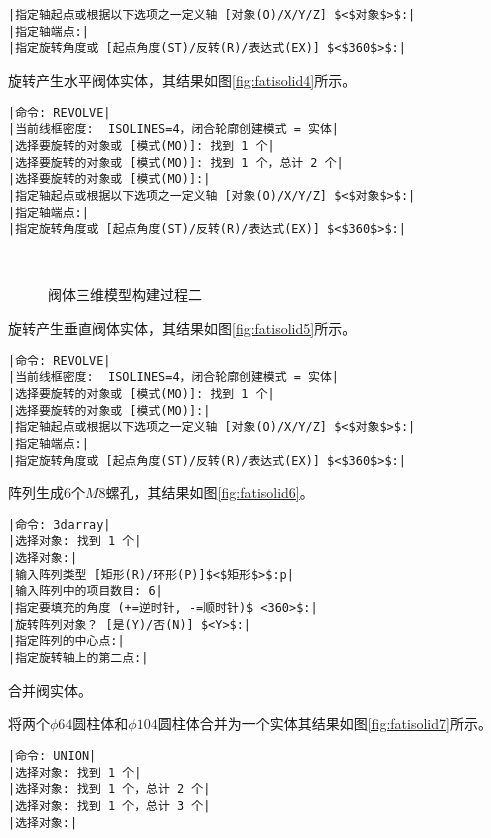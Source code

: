 \begin{procedure}
\begin{lstlisting}
|指定轴起点或根据以下选项之一定义轴 [对象(O)/X/Y/Z] $<$对象$>$:|
|指定轴端点:|
|指定旋转角度或 [起点角度(ST)/反转(R)/表达式(EX)] $<$360$>$:|
\end{lstlisting}
旋转产生水平阀体实体，其结果如图\ref{fig:fatisolid4}所示。
\begin{lstlisting}
|命令: REVOLVE|
|当前线框密度:  ISOLINES=4，闭合轮廓创建模式 = 实体|
|选择要旋转的对象或 [模式(MO)]: 找到 1 个|
|选择要旋转的对象或 [模式(MO)]: 找到 1 个，总计 2 个|
|选择要旋转的对象或 [模式(MO)]:|
|指定轴起点或根据以下选项之一定义轴 [对象(O)/X/Y/Z] $<$对象$>$:|
|指定轴端点:|
|指定旋转角度或 [起点角度(ST)/反转(R)/表达式(EX)] $<$360$>$:|
\end{lstlisting}
\begin{figure}[htbp]
\centering
{}\hspace{30pt}
\\
\hspace{30pt}
\caption{阀体三维模型构建过程二}
\end{figure}

旋转产生垂直阀体实体，其结果如图\ref{fig:fatisolid5}所示。
\begin{lstlisting}
|命令: REVOLVE|
|当前线框密度:  ISOLINES=4，闭合轮廓创建模式 = 实体|
|选择要旋转的对象或 [模式(MO)]: 找到 1 个|
|选择要旋转的对象或 [模式(MO)]:|
|指定轴起点或根据以下选项之一定义轴 [对象(O)/X/Y/Z] $<$对象$>$:|
|指定轴端点:|
|指定旋转角度或 [起点角度(ST)/反转(R)/表达式(EX)] $<$360$>$:|
\end{lstlisting}
\item 阵列生成6个$M8$螺孔，其结果如图\ref{fig:fatisolid6}。
\begin{lstlisting}
|命令: 3darray|
|选择对象: 找到 1 个|
|选择对象:|
|输入阵列类型 [矩形(R)/环形(P)]$<$矩形$>$:p|
|输入阵列中的项目数目: 6|
|指定要填充的角度 (+=逆时针, -=顺时针)$ <360>$:|
|旋转阵列对象？ [是(Y)/否(N)] $<Y>$:|
|指定阵列的中心点:|
|指定旋转轴上的第二点:|
\end{lstlisting}
\item 合并阀实体。

将两个$\phi 64$圆柱体和$\phi 104$圆柱体合并为一个实体其结果如图\ref{fig:fatisolid7}所示。
\begin{lstlisting}
|命令: UNION|
|选择对象: 找到 1 个|
|选择对象: 找到 1 个，总计 2 个|
|选择对象: 找到 1 个，总计 3 个|
|选择对象:|
\end{lstlisting}


\end{procedure}

